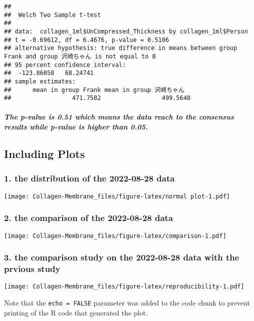 \documentclass[
]{article}
\begin{document}
\begin{verbatim}
## 
##  Welch Two Sample t-test
## 
## data:  collagen_1ml$UnCompressed_Thickness by collagen_1ml$Person
## t = -0.69612, df = 6.4676, p-value = 0.5106
## alternative hypothesis: true difference in means between group Frank and group 沢崎ちゃん is not equal to 0
## 95 percent confidence interval:
##  -123.86058   68.24741
## sample estimates:
##      mean in group Frank mean in group 沢崎ちゃん 
##                 471.7582                 499.5648
\end{verbatim}

\hypertarget{the-p-value-is-0.51-which-means-the-data-reach-to-the-consensus-results-while-p-value-is-higher-than-0.05.}{%
\subparagraph{The p-value is 0.51 which means the data reach to the
consensus results while p-value is higher than
0.05.}\label{the-p-value-is-0.51-which-means-the-data-reach-to-the-consensus-results-while-p-value-is-higher-than-0.05.}}

\hypertarget{including-plots}{%
\subsection{Including Plots}\label{including-plots}}

\hypertarget{the-distribution-of-the-2022-08-28-data}{%
\subsubsection{1. the distribution of the 2022-08-28
data}\label{the-distribution-of-the-2022-08-28-data}}

\texttt{[image: Collagen-Membrane\_files/figure-latex/normal plot-1.pdf]}

\hypertarget{the-comparison-of-the-2022-08-28-data}{%
\subsubsection{2. the comparison of the 2022-08-28
data}\label{the-comparison-of-the-2022-08-28-data}}

\texttt{[image: Collagen-Membrane\_files/figure-latex/comparison-1.pdf]}

\hypertarget{the-comparison-study-on-the-2022-08-28-data-with-the-prvious-study}{%
\subsubsection{3. the comparison study on the 2022-08-28 data with the
prvious
study}\label{the-comparison-study-on-the-2022-08-28-data-with-the-prvious-study}}

\texttt{[image: Collagen-Membrane\_files/figure-latex/reproducibility-1.pdf]}

Note that the \texttt{echo\ =\ FALSE} parameter was added to the code
chunk to prevent printing of the R code that generated the plot.
\end{document}
